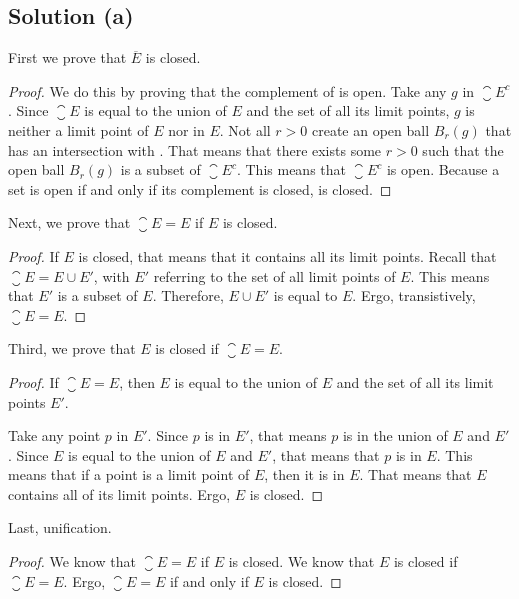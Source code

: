 \documentclass[11pt]{article}
\begin{document}
    \subsection{Solution (a)}
        First we prove that $\overline{E}$ is closed.
        \begin{proof}
            We do this by proving that the complement of  is open.
            Take any $g$ in $\closure{E}^c$.
            Since $\closure{E}$ is equal to the union of $E$ and the set of all its limit points, $g$ is neither a limit point of $E$ nor in $E$.
            Not all $r > 0$ create an open ball $B_r(g)$ that has an intersection with .
            That means that there exists some $r > 0$ such that the open ball $B_r(g)$ is a subset of $\closure{E}^c$.
            This means that $\closure{E}^c$ is open.
            Because a set is open if and only if its complement is closed,  is closed.
        \end{proof}
        Next, we prove that $\closure{E} = E$ if $E$ is closed.
        \begin{proof}
            If $E$ is closed, that means that it contains all its limit points.
            Recall that $\closure{E} = E \cup E'$, with $E'$ referring to the set of all limit points of $E$.
            This means that $E'$ is a subset of $E$.
            Therefore, $E \cup E'$ is equal to $E$.
            Ergo, transistively, $\closure{E} = E$.
        \end{proof}
        Third, we prove that $E$ is closed if $\closure{E} = E$.
        \begin{proof}
            If $\closure{E} = E$, then $E$ is equal to the union of $E$ and the set of all its limit points $E'$.

            Take any point $p$ in $E'$.
            Since $p$ is in $E'$, that means $p$ is in the union of $E$ and $E'$.
            Since $E$ is equal to the union of $E$ and $E'$, that means that $p$ is in $E$.
            This means that if a point is a limit point of $E$, then it is in $E$.
            That means that $E$ contains all of its limit points.
            Ergo, $E$ is closed.
        \end{proof}
        Last, unification.
        \begin{proof}
            We know that $\closure{E} = E$ if $E$ is closed.
            We know that $E$ is closed if $\closure{E} = E$.
            Ergo, $\closure{E} = E$ if and only if $E$ is closed.
        \end{proof}
    
\end{document}
